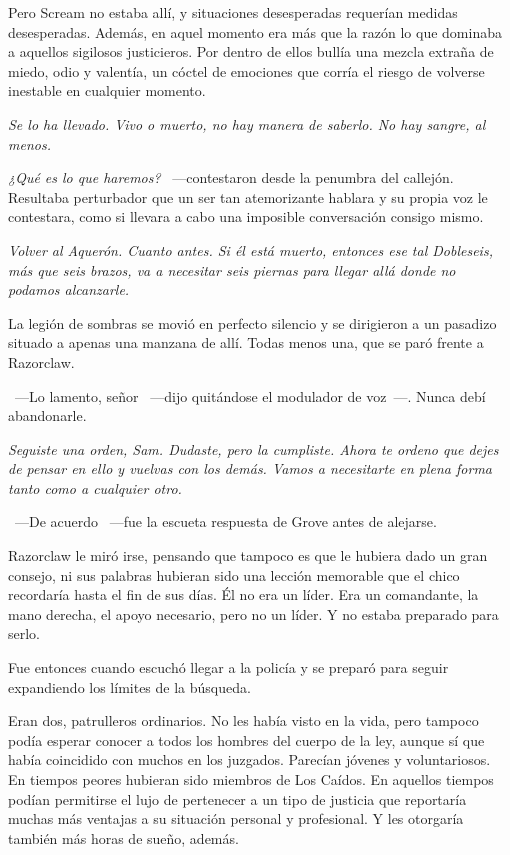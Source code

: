 Pero Scream no estaba allí, y situaciones desesperadas requerían medidas desesperadas. Además, en aquel momento era más que la razón lo que dominaba a aquellos sigilosos justicieros. Por dentro de ellos bullía una mezcla extraña de miedo, odio y valentía, un cóctel de emociones que corría el riesgo de volverse inestable en cualquier momento.

\emph{Se lo ha llevado. Vivo o muerto, no hay manera de saberlo. No hay sangre, al menos.}

\emph{¿Qué es lo que haremos?} ~---contestaron desde la penumbra del callejón. Resultaba perturbador que un ser tan atemorizante hablara y su propia voz le contestara, como si llevara a cabo una imposible conversación consigo mismo.

\emph{Volver al Aquerón. Cuanto antes. Si él está muerto, entonces ese tal Dobleseis, más que seis brazos, va a necesitar seis piernas para llegar allá donde no podamos alcanzarle.}

La legión de sombras se movió en perfecto silencio y se dirigieron a un pasadizo situado a apenas una manzana de allí. Todas menos una, que se paró frente a Razorclaw.

~---Lo lamento, señor ~---dijo quitándose el modulador de voz~---. Nunca debí abandonarle.

\emph{Seguiste una orden, Sam. Dudaste, pero la cumpliste. Ahora te ordeno que dejes de pensar en ello y vuelvas con los demás. Vamos a necesitarte en plena forma tanto como a cualquier otro.}

~---De acuerdo ~---fue la escueta respuesta de Grove antes de alejarse.

Razorclaw le miró irse, pensando que tampoco es que le hubiera dado un gran consejo, ni sus palabras hubieran sido una lección memorable que el chico recordaría hasta el fin de sus días. Él no era un líder. Era un comandante, la mano derecha, el apoyo necesario, pero no un líder. Y no estaba preparado para serlo.

Fue entonces cuando escuchó llegar a la policía y se preparó para seguir expandiendo los límites de la búsqueda.

Eran dos, patrulleros ordinarios. No les había visto en la vida, pero tampoco podía esperar conocer a todos los hombres del cuerpo de la ley, aunque sí que había coincidido con muchos en los juzgados. Parecían jóvenes y voluntariosos. En tiempos peores hubieran sido miembros de Los Caídos. En aquellos tiempos podían permitirse el lujo de pertenecer a un tipo de justicia que reportaría muchas más ventajas a su situación personal y profesional. Y les otorgaría también más horas de sueño, además.

